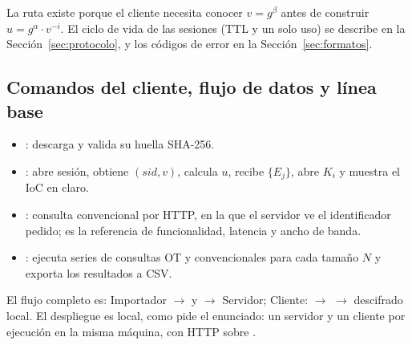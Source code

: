 La ruta  existe porque el cliente necesita conocer
$v = g^\beta$ antes de construir $u = g^\alpha \cdot v^{-i}$. El ciclo de
vida de las sesiones (TTL y un solo uso) se describe en la
Secci\'on~\ref{sec:protocolo}, y los c\'odigos de error en la
Secci\'on~\ref{sec:formatos}.

\subsection{Comandos del cliente, flujo de datos y l\'inea base}
\begin{itemize}
\item {}: descarga  y valida su huella SHA-256.
\item {}: abre sesi\'on, obtiene $(sid, v)$, calcula
$u$, recibe $\{E_j\}$, abre $K_i$ y muestra el IoC en claro.
\item {}: consulta convencional por HTTP, en la
que el servidor ve el identificador pedido; es la referencia de
funcionalidad, latencia y ancho de banda.
\item {}: ejecuta series de consultas OT y convencionales para
cada tama\~no $N$ y exporta los resultados a CSV.
\end{itemize}
El flujo completo es: Importador $\to$  y 
$\to$ Servidor; Cliente:  $\to$  $\to$
descifrado local. El despliegue es local, como pide el enunciado: un servidor
y un cliente por ejecuci\'on en la misma m\'aquina, con HTTP sobre
.
